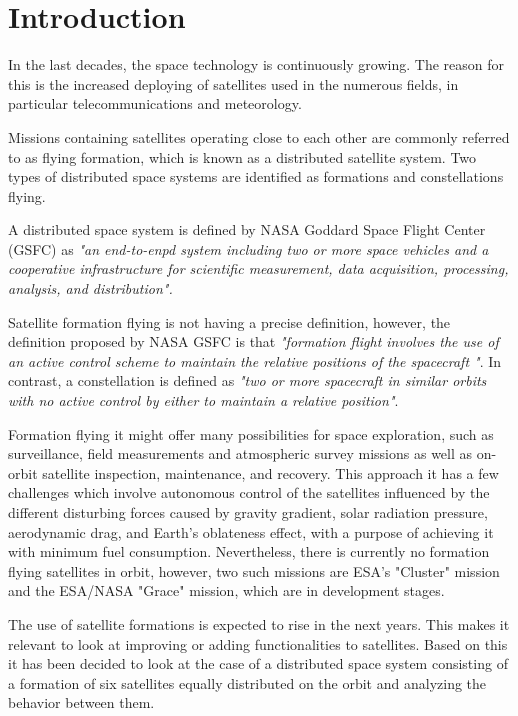 \chapter{Introduction}\label{chap:Introduction}
In the last decades, the space technology is continuously growing. The reason for this is the increased deploying of satellites used in the numerous fields, in particular telecommunications and meteorology.  \cite{SIDI}

Missions containing satellites operating close to each other are commonly referred to as flying formation, which is known as a distributed satellite system. Two types of distributed space systems are identified as formations and constellations flying. 

A distributed space system is defined by NASA Goddard Space Flight Center (GSFC) as \textit{"an end-to-enpd system including two or more space vehicles and a cooperative infrastructure for scientific measurement, data acquisition, processing, analysis, and distribution".} \cite{SFF}

Satellite formation flying is not having a precise definition, however, the definition proposed by NASA GSFC is that \textit{"formation flight involves the use of an active control scheme to maintain the relative positions of the spacecraft "}. In contrast, a constellation is defined as \textit{"two or more spacecraft in similar orbits with no active control by either to maintain a relative position"}. \cite{SF}

Formation flying it might offer many possibilities for space exploration, such as surveillance, field measurements and atmospheric survey missions as well as on-orbit satellite inspection, maintenance, and recovery. This approach it has a few challenges which involve autonomous control of the satellites influenced by the different disturbing forces caused by gravity gradient, solar radiation pressure, aerodynamic drag, and Earth’s oblateness effect, with a purpose of achieving it with minimum fuel consumption. Nevertheless, there is currently no formation flying satellites in orbit, however, two such missions are ESA’s "Cluster" mission and the ESA/NASA "Grace" mission, which are in development stages. \cite{SF}

The use of satellite formations is expected to rise in the next years. This makes it relevant to look at improving or adding functionalities to satellites. Based on this it has been decided to look at the case of a distributed space system consisting of a formation of six satellites equally distributed on the orbit and analyzing the behavior between them.
 \vspace{2cm}
